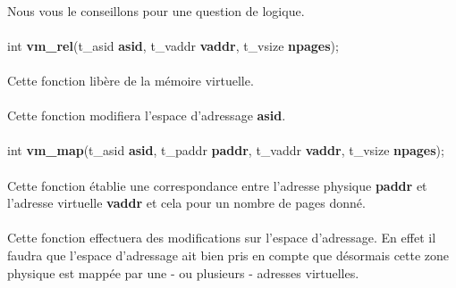 \documentclass[10pt,a4wide]{article}
\begin{document}
\paragraph{}

Nous vous le conseillons pour une question de logique.

\paragraph{}

\hspace{1.5cm}int \textbf{vm\_rel}(t\_asid \textbf{asid},
                                   t\_vaddr \textbf{vaddr},
                                   t\_vsize \textbf{npages});

\paragraph{}

Cette fonction lib\`ere de la m\'emoire virtuelle.

\paragraph{}

Cette fonction modifiera l'espace d'adressage \textbf{asid}.

\paragraph{}

\hspace{1.5cm}int \textbf{vm\_map}(t\_asid \textbf{asid},
				   t\_paddr \textbf{paddr},
                                   t\_vaddr \textbf{vaddr},
                                   t\_vsize \textbf{npages});

\paragraph{}

Cette fonction \'etablie une correspondance entre l'adresse physique
\textbf{paddr} et l'adresse virtuelle \textbf{vaddr} et cela pour
un nombre de pages donn\'e.

\paragraph{}

Cette fonction effectuera des modifications sur l'espace d'adressage.
En effet il faudra que l'espace d'adressage ait bien pris en compte que
d\'esormais cette zone physique est mapp\'ee par une - ou plusieurs -
adresses virtuelles.
\end{document}
